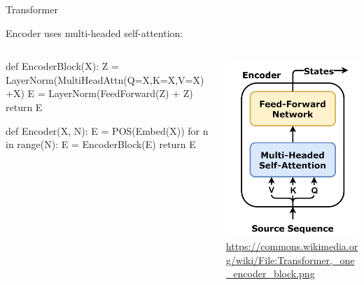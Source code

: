 \documentclass[ignorenonframetext,xcolor=x11names]{beamer}
\begin{document}
\begin{frame}[fragile]{Transformer}

Encoder uses multi-headed self-attention:

\begin{columns}
\begin{column}{.75\textwidth}
\begin{textcode}
def EncoderBlock(X):
  Z = LayerNorm(MultiHeadAttn(Q=X,K=X,V=X)+X)
  E = LayerNorm(FeedForward(Z) + Z)
  return E
\end{textcode}

\begin{textcode}
def Encoder(X, N):
  E = POS(Embed(X))
  for n in range(N):
    E = EncoderBlock(E)
  return E
\end{textcode}
\end{column}
\begin{column}{.3\textwidth}
\includegraphics[width=\textwidth]{Transformer,_one_encoder_block.png} \\

\tiny \url{https://commons.wikimedia.org/wiki/File:Transformer,_one_encoder_block.png}
\end{column}
\end{columns}
\end{frame}
\end{document}
